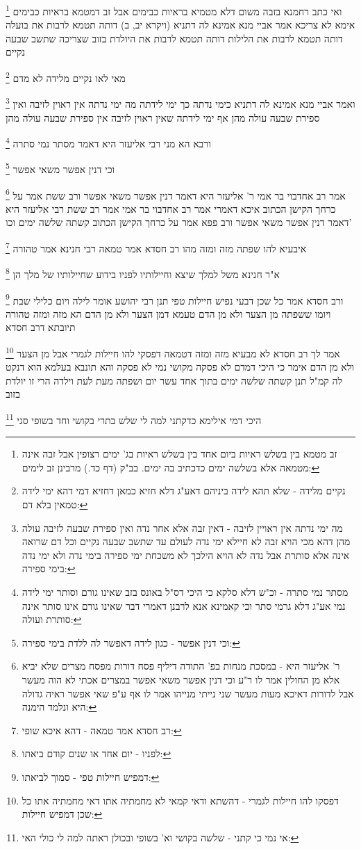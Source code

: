 \documentclass[12pt, openany]{book}
\newcommand{\footnotecomment}[1]{
	\renewcommand\thefootnote{}
	\footnote{#1}}
\newcommand{\commenta}[1]{\footnotecomment{#1}}
\begin{document}
{{\commenta{זב מטמא בין בשלש ראיות ביום אחד בין בשלש ראיות בג' ימים רצופין אבל זבה אינה מטמאה אלא בשלשה ימים כדכתיב בה ימים. בב"ק (דף כד.) מרבינן זב לימים: }
ואי כתב רחמנא בזבה משום דלא מטמיא בראיות כבימים אבל זב דמטמא בראיות כבימים אימא לא צריכא 
אמר אביי מנא אמינא לה דתניא (ויקרא יב, ב) דותה תטמא לרבות את בועלה
דותה תטמא לרבות את הלילות דותה תטמא לרבות את היולדת בזוב שצריכה שתשב שבעה נקיים 
\commenta{נקיים מלידה - שלא תהא לידה ביניהם דאע"ג דלא חזיא כמאן דחזיא דמי דהא ימי לידה טמאין בלא דם:}
מאי לאו נקיים מלידה לא מדם 
\commenta{מה ימי נדתה אין ראויין לזיבה - דאין זבה אלא אחר נדה ואין ספירת שבעה לזיבה עולה מהן דהא מכי הויא זבה לא חיילא ימי נדה לעולם עד שתשב שבעה נקיים וכל דם שרואה אינה אלא סותרת אבל נדה לא הויא הילכך לא משכחת ימי ספירה בימי נדה ולא ימי נדה בימי ספירה:}
ואמר אביי מנא אמינא לה דתניא כימי נדתה כך ימי לידתה מה ימי נדתה אין ראוין לזיבה ואין ספירת שבעה עולה מהן אף ימי לידתה שאין ראוין לזיבה אין ספירת שבעה עולה מהן 
\commenta{מסתר נמי סתרה - וכ"ש דלא סלקא כי היכי דס"ל באונס בזב שאינו גורם וסותר ימי לידה נמי אע"ג דלא גרמי סתר וכי קאמינא אנא לרבנן דאמרי דבר שאינו גורם אינו סותר אינה סותרת ועולה:}
ורבא הא מני רבי אליעזר היא דאמר מסתר נמי סתרה 
\commenta{וכי דנין אפשר - כגון לידה דאפשר לה ללדת בימי ספירה:}
וכי דנין אפשר משאי אפשר 
\commenta{ר' אליעזר היא - במסכת מנחות בפ' התודה דיליף פסח דורות מפסח מצרים שלא יביא אלא מן החולין אמר לו ר"ע וכי דנין אפשר משאי אפשר במצרים אכתי לא הוה מעשר אבל לדורות דאיכא מעות מעשר שני נייתי מנייהו אמר לו אף ע"פ שאי אפשר ראיה גדולה היא ונלמד הימנה:}
אמר רב אחדבוי בר אמי ר' אליעזר היא דאמר דנין אפשר משאי אפשר ורב ששת אמר על כרחך הקישן הכתוב איכא דאמרי אמר רב אחדבוי בר אמי אמר רב ששת רבי אליעזר היא דאמר דנין אפשר משאי אפשר ורב פפא אמר על כרחך הקישן הכתוב
קשתה שלשה ימים וכו'
\commenta{רב חסדא אמר טמאה - דהא איכא שופי:}
איבעיא להו שפתה מזה ומזה מהו רב חסדא אמר טמאה רבי חנינא אמר טהורה 
\commenta{לפניו - יום אחד או שנים קודם ביאתו:}
א"ר חנינא משל למלך שיצא וחיילותיו לפניו בידוע שחיילותיו של מלך הן 
\commenta{דמפיש חיילות טפי - סמוך לביאתו:}
ורב חסדא אמר כל שכן דבעי נפיש חיילות טפי 
תנן רבי יהושע אומר לילה ויום כלילי שבת ויומו ששפתה מן הצער ולא מן הדם טעמא דמן הצער ולא מן הדם הא מזה ומזה טהורה תיובתא דרב חסדא 
\commenta{דפסקו להו חיילות לגמרי - דהשתא ודאי קמאי לא מחמתיה אתו דאי מחמתיה אתו כל שכן דמפיש חיילות:}
אמר לך רב חסדא לא מבעיא מזה ומזה דטמאה דפסקי להו חיילות לגמרי אבל מן הצער ולא מן הדם אימר כי היכי דמדם לא פסקה מקושי נמי לא פסקה והא תונבא בעלמא הוא דנקט לה קמ"ל 
תנן קשתה שלשה ימים בתוך אחד עשר יום ושפתה מעת לעת וילדה הרי זו יולדת בזוב 
\commenta{אי נמי כי קתני - שלשה בקושי וא' בשופי ובכולן ראתה למה לי כולי האי:}
היכי דמי אילימא כדקתני למה לי שלש בתרי בקושי וחד בשופי סגי 
}}
\end{document}
